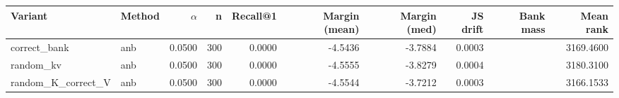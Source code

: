 \begin{tabular}{l l r r r r r r r r}
\toprule
Variant & Method & $\alpha$ & n & Recall@1 & Margin (mean) & Margin (med) & JS drift & Bank mass & Mean rank \\
\midrule
correct\_bank & anb & 0.0500 & 300 & 0.0000 & -4.5436 & -3.7884 & 0.0003 &  & 3169.4600 \\
random\_kv & anb & 0.0500 & 300 & 0.0000 & -4.5555 & -3.8279 & 0.0004 &  & 3180.3100 \\
random\_K\_correct\_V & anb & 0.0500 & 300 & 0.0000 & -4.5544 & -3.7212 & 0.0003 &  & 3166.1533 \\
\bottomrule
\end{tabular}
